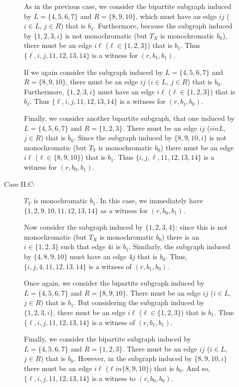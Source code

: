 \documentclass{article}
\theoremstyle{definition}
\begin{document}
\begin{description}
\begin{description}
    As in the previous case, we consider the bipartite subgraph induced by
    $L=\{4,5,6,7\}$ and $R=\{8,9,10\}$, which must have an edge $ij$ ($i \in
    L$, $j \in R$) that is $b_{1}$.  Furthermore, because the subgraph induced
    by $\{1,2,3,i\}$ is not monochromatic (but $T_{X}$ is monochromatic
    $b_{0}$), there must be an edge $i\ell$ ($\ell \in \{1,2,3\}$) that is
    $b_{1}$.  Thus $\{\ell, i, j, 11, 12, 13, 14\}$ is a witness for $(r,
    b_{1}, b_{1})$.

    If we again consider the subgraph induced by $L=\{4,5,6,7\}$ and
    $R=\{8,9,10\}$, there must be an edge $ij$ ($i \in L$, $j \in R$) that is
    $b_{0}$. Furthermore, $\{1,2,3,i\}$ must have an edge $i\ell$ ($\ell \in
    \{1,2,3\}$) that is $b_{1}$. Thus $\{\ell, i, j, 11, 12, 13, 14\}$ is a
    witness for $(r, b_{1}, b_{0})$.

    Finally, we consider another bipartite subgraph, that one induced by
    $L=\{4,5,6,7\}$ and $R=\{1,2,3\}$. There must be an edge $ij$ ($i in L$, $j
    \in R$) that is $b_{0}$. Since the subgraph induced by $\{8,9,10,i\}$ is
    not monochromatic (but $T_{Y}$ is monochromatic $b_{0}$) there must be an
    edge $i\ell$ ($\ell \in \{8,9,10\}$) that is $b_{1}$. Thus $\{i, j, \ell,
    11, 12, 13, 14\}$ is a witness for $(r, b_{0}, b_{1})$.
  \item[Case II.C:] $T_{Y}$ is monochromatic $b_{1}$. In this case, we
    immediately have $\{1,2,9,10,11,12,13,14\}$ as a witness for
    $(r,b_{0},b_{1})$.

    Now consider the subgraph induced by $\{1,2,3,4\}$: since this is not
    monochromatic (but $T_{X}$ is monochromatic $b_{0}$) there is an $i \in
    \{1,2,3\}$ such that edge $4i$ is $b_{1}$.  Similarly, the subgraph induced
    by $\{4,8,9,10\}$ must have an edge $4j$ that is $b_{0}$.  Thus, $\{i, j,
    4, 11, 12, 13, 14\}$ is a witness of $(r,b_{1},b_{0})$.

    Once again, we consider the bipartite subgraph induced by $L=\{4,5,6,7\}$
    and $R=\{8,9,10\}$.  There must be an edge $ij$ ($i \in L$, $j \in R$) that
    is $b_{1}$. But considering the subgraph induced by $\{1,2,3,i\}$, there
    must be an edge $i\ell$ ($\ell \in \{1,2,3\}$) that is $b_{1}$. Thus
    $\{\ell, i, j, 11, 12, 13, 14\}$ is a witness of $(r, b_{1}, b_{1})$.

    Finally, we consider the bipartite subgraph induced by $L=\{4,5,6,7\}$ and
    $R=\{1,2,3\}$. There must be an edge $ij$ ($i \in L$, $j \in R$) that is
    $b_{0}$. However, in the subgraph induced by $\{8,9,10,i\}$ there must be
    an edge $i\ell$ ($\ell in \{8,9,10\}$) that is $b_{0}$. And so, $\{\ell, i,
    j, 11, 12, 13, 14\}$ is a witness to $(r, b_{0}, b_{0})$.
  \end{description}
\end{description}
\end{document}
